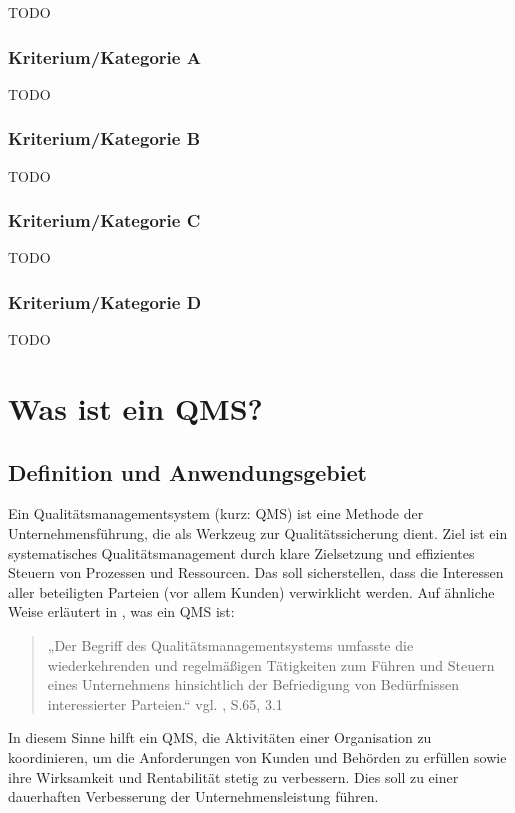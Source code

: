 \documentclass[11pt]{scrartcl}       %
\begin{document}
TODO

 

\subsubsection{Kriterium/Kategorie A}

TODO


\subsubsection{Kriterium/Kategorie B}

TODO


\subsubsection{Kriterium/Kategorie C}

TODO


\subsubsection{Kriterium/Kategorie D}

TODO

\newpage
\section{Was ist ein QMS?}
\subsection{Definition und Anwendungsgebiet}
Ein Qualitätsmanagementsystem (kurz: QMS) ist eine Methode der Unternehmensführung, die als Werkzeug zur Qualitätssicherung dient. Ziel ist ein systematisches Qualitätsmanagement durch klare Zielsetzung und effizientes Steuern von Prozessen und Ressourcen. Das soll sicherstellen, dass die Interessen aller beteiligten Parteien (vor allem Kunden) verwirklicht werden. Auf ähnliche Weise erläutert \citeauthor{mai2020grundlage} in \citeyear{mai2020grundlage}, was ein QMS ist:

\begin{quotation}
„Der Begriff des Qualitätsmanagementsystems umfasste die wiederkehrenden und regelmäßigen Tätigkeiten zum Führen und Steuern eines Unternehmens hinsichtlich der Befriedigung von Bedürfnissen interessierter Parteien.“ vgl. \cite{mai2020grundlage}, S.65, 3.1
\end{quotation}

In diesem Sinne hilft ein QMS, die Aktivitäten einer Organisation zu koordinieren, um die Anforderungen von Kunden und Behörden zu erfüllen sowie ihre Wirksamkeit und Rentabilität stetig zu verbessern. Dies soll zu einer dauerhaften Verbesserung der Unternehmensleistung führen.
\\
\end{document}
